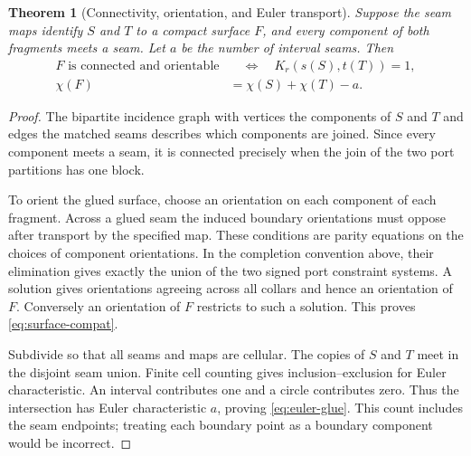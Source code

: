 \documentclass[11pt,letterpaper]{article}
\newtheorem{theorem}{Theorem}[section]
\theoremstyle{definition}
\begin{document}
\begin{theorem}[Connectivity, orientation, and Euler transport]\label{thm:surface-gluing}
Suppose the seam maps identify $S$ and $T$ to a compact surface $F$, and every component of both fragments meets a seam. Let $a$ be the number of interval seams. Then
\begin{align}
 F\text{ is connected and orientable}
 &\quad\Longleftrightarrow\quad K_r(s(S),t(T))=1,\label{eq:surface-compat}\\
 \chi(F)&=\chi(S)+\chi(T)-a.\label{eq:euler-glue}
\end{align}
\end{theorem}
\begin{proof}
The bipartite incidence graph with vertices the components of $S$ and $T$ and edges the matched seams describes which components are joined. Since every component meets a seam, it is connected precisely when the join of the two port partitions has one block.

To orient the glued surface, choose an orientation on each component of each fragment. Across a glued seam the induced boundary orientations must oppose after transport by the specified map. These conditions are parity equations on the choices of component orientations. In the completion convention above, their elimination gives exactly the union of the two signed port constraint systems. A solution gives orientations agreeing across all collars and hence an orientation of $F$. Conversely an orientation of $F$ restricts to such a solution. This proves \eqref{eq:surface-compat}.

Subdivide so that all seams and maps are cellular. The copies of $S$ and $T$ meet in the disjoint seam union. Finite cell counting gives inclusion--exclusion for Euler characteristic. An interval contributes one and a circle contributes zero. Thus the intersection has Euler characteristic $a$, proving \eqref{eq:euler-glue}. This count includes the seam endpoints; treating each boundary point as a boundary component would be incorrect.
\end{proof}
\end{document}
